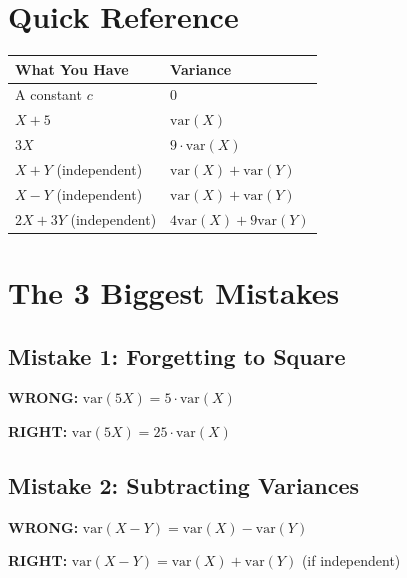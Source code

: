 \documentclass[12pt]{article}
\begin{document}
\newpage

\section*{\Large Quick Reference}

\begin{center}
\begin{tabular}{|p{5cm}|p{8cm}|}
\hline
\textbf{\large What You Have} & \textbf{\large Variance} \\
\hline
\hline
A constant $c$ & $0$ \\
\hline
$X + 5$ & $\text{var}(X)$ \\
\hline
$3X$ & $9 \cdot \text{var}(X)$ \\
\hline
$X + Y$ (independent) & $\text{var}(X) + \text{var}(Y)$ \\
\hline
$X - Y$ (independent) & $\text{var}(X) + \text{var}(Y)$ \\
\hline
$2X + 3Y$ (independent) & $4\text{var}(X) + 9\text{var}(Y)$ \\
\hline
\end{tabular}
\end{center}

\vspace{2em}

\section*{\Large The 3 Biggest Mistakes}

\subsection*{Mistake 1: Forgetting to Square}

\textbf{WRONG:} $\text{var}(5X) = 5 \cdot \text{var}(X)$

\textbf{RIGHT:} $\text{var}(5X) = 25 \cdot \text{var}(X)$

\vspace{1em}

\subsection*{Mistake 2: Subtracting Variances}

\textbf{WRONG:} $\text{var}(X - Y) = \text{var}(X) - \text{var}(Y)$

\textbf{RIGHT:} $\text{var}(X - Y) = \text{var}(X) + \text{var}(Y)$ (if independent)

\vspace{1em}
\end{document}
